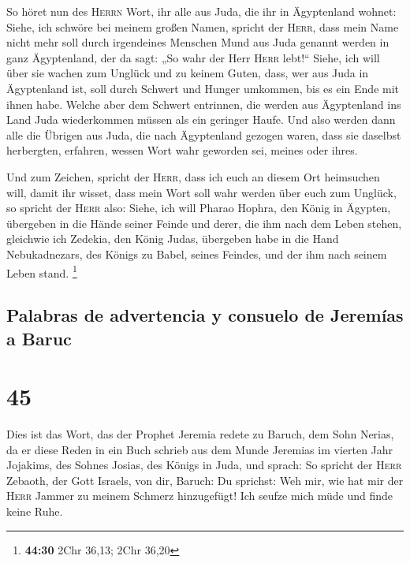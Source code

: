  So höret nun des \textsc{Herrn} Wort, ihr alle aus Juda,
die ihr in Ägyptenland wohnet: Siehe, ich schwöre bei meinem großen
Namen, spricht der \textsc{Herr}, dass mein Name nicht mehr soll durch
irgendeines Menschen Mund aus Juda genannt werden in ganz Ägyptenland,
der da sagt: „So wahr der Herr \textsc{Herr} lebt!{}`` 
Siehe, ich will über sie wachen zum Unglück und zu keinem Guten, dass,
wer aus Juda in Ägyptenland ist, soll durch Schwert und Hunger umkommen,
bis es ein Ende mit ihnen habe.  Welche aber dem Schwert
entrinnen, die werden aus Ägyptenland ins Land Juda wiederkommen müssen
als ein geringer Haufe. Und also werden dann alle die Übrigen aus Juda,
die nach Ägyptenland gezogen waren, dass sie daselbst herbergten,
erfahren, wessen Wort wahr geworden sei, meines oder ihres.

 Und zum Zeichen, spricht der \textsc{Herr}, dass ich
euch an diesem Ort heimsuchen will, damit ihr wisset, dass mein Wort
soll wahr werden über euch zum Unglück,  so spricht der
\textsc{Herr} also: Siehe, ich will Pharao Hophra, den König in Ägypten,
übergeben in die Hände seiner Feinde und derer, die ihm nach dem Leben
stehen, gleichwie ich Zedekia, den König Judas, übergeben habe in die
Hand Nebukadnezars, des Königs zu Babel, seines Feindes, und der ihm
nach seinem Leben stand. \footnote{\textbf{44:30} 2Chr 36,13; 2Chr 36,20}

\hypertarget{palabras-de-advertencia-y-consuelo-de-jeremuxedas-a-baruc}{%
\subsection{Palabras de advertencia y consuelo de Jeremías a
Baruc}\label{palabras-de-advertencia-y-consuelo-de-jeremuxedas-a-baruc}}

\hypertarget{section-44}{%
\section{45}\label{section-44}}

 Dies ist das Wort, das der Prophet Jeremia redete zu
Baruch, dem Sohn Nerias, da er diese Reden in ein Buch schrieb aus dem
Munde Jeremias im vierten Jahr Jojakims, des Sohnes Josias, des Königs
in Juda, und sprach:  So spricht der \textsc{Herr}
Zebaoth, der Gott Israels, von dir, Baruch:  Du sprichst:
Weh mir, wie hat mir der \textsc{Herr} Jammer zu meinem Schmerz
hinzugefügt! Ich seufze mich müde und finde keine Ruhe.

